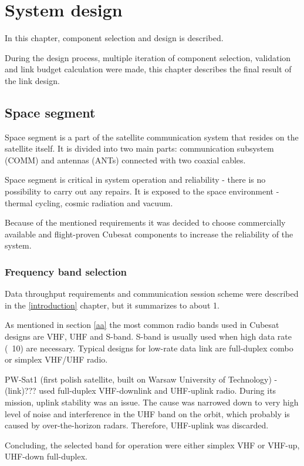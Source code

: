 \part{System design}

In this chapter, component selection and design is described.

During the design process, multiple iteration of component selection, validation and link budget calculation were made, this chapter describes the final result of the link design. 

\chapter{Space segment}
Space segment is a part of the satellite communication system that resides on the satellite itself. It is divided into two main parts: communication subsystem (COMM) and antennas (ANTs) connected with two coaxial cables.

Space segment is critical in system operation and reliability - there is no possibility to carry out any repairs. It is exposed to the space environment - thermal cycling, cosmic radiation and vacuum.

Because of the mentioned requirements it was decided to choose commercially available and flight-proven Cubesat components to increase the reliability of the system.

\section{Frequency band selection}
Data throughput requirements and communication session scheme were described in the \ref{introduction} chapter, but it summarizes to about \SI{1}{\kbps}.

As mentioned in section \ref{aa} the most common radio bands used in Cubesat designs are VHF, UHF and S-band. S-band is usually used when high data rate (~\SI{10}{\Mbps}) are necessary. Typical designs for low-rate data link are full-duplex combo or simplex VHF/UHF radio.

PW-Sat1 (first polish satellite, built on Warsaw University of Technology) - (link)??? used full-duplex VHF-downlink and UHF-uplink radio. During its mission, uplink stability was an issue. The cause was narrowed down to very high level of noise and interference in the UHF band on the orbit, which probably is caused by over-the-horizon radars. Therefore, UHF-uplink was discarded.

Concluding, the selected band for operation were either simplex VHF or VHF-up, UHF-down full-duplex.

